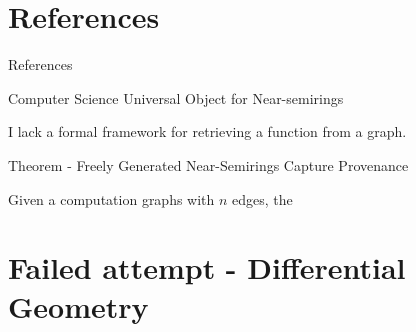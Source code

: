 \documentclass[11pt]{beamer}
\begin{document}
\section{References}
\begin{frame}{References}




\end{frame}

\begin{frame}{Computer Science Universal Object for Near-semirings}

I lack a formal framework for retrieving a function from a graph.

\begin{block}{Theorem - Freely Generated Near-Semirings Capture Provenance}

	Given a computation graphs with $n$ edges, the 
	
\end{block}

\end{frame}

\section{Failed attempt - Differential Geometry}

\begin{frame}



\end{frame}

\cite{ramusat_semiring-based_2022}
\end{document}
